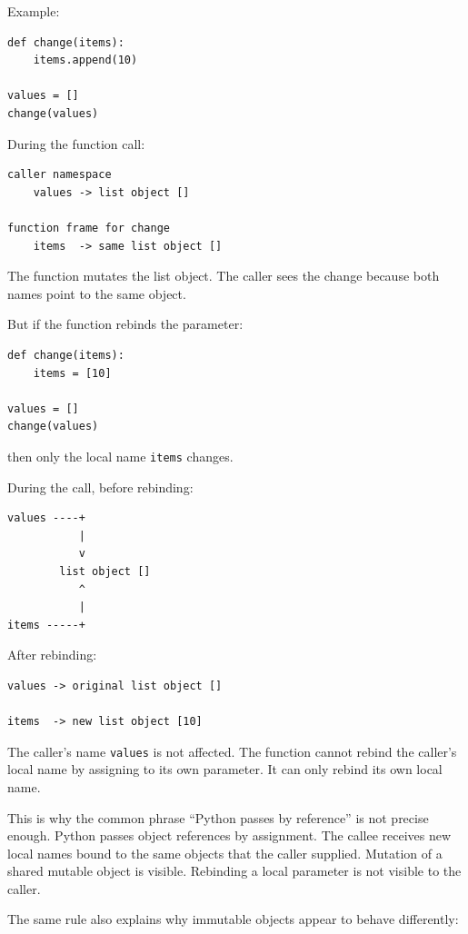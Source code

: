 Example:

\begin{verbatim}
def change(items):
    items.append(10)

values = []
change(values)
\end{verbatim}

During the function call:

\begin{verbatim}
caller namespace
    values -> list object []

function frame for change
    items  -> same list object []
\end{verbatim}

The function mutates the list object. The caller sees the change because both names point to the same object.

But if the function rebinds the parameter:

\begin{verbatim}
def change(items):
    items = [10]

values = []
change(values)
\end{verbatim}

then only the local name \texttt{items} changes.

During the call, before rebinding:

\begin{verbatim}
values ----+
           |
           v
        list object []
           ^
           |
items -----+
\end{verbatim}

After rebinding:

\begin{verbatim}
values -> original list object []

items  -> new list object [10]
\end{verbatim}

The caller's name \texttt{values} is not affected. The function cannot rebind the caller's local name by assigning to its own parameter. It can only rebind its own local name.

This is why the common phrase ``Python passes by reference'' is not precise enough. Python passes object references by assignment. The callee receives new local names bound to the same objects that the caller supplied. Mutation of a shared mutable object is visible. Rebinding a local parameter is not visible to the caller.

The same rule also explains why immutable objects appear to behave differently:

